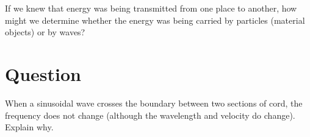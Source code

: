 \documentclass[12pt]{article}
\begin{document}
If we knew that energy was being transmitted from one place
to another, how might we determine whether the energy was
being carried by particles (material objects) or by waves?


\section*{Question \thequestions}

When a sinusoidal wave crosses the boundary between two
sections of cord, the frequency does not change
(although the wavelength and velocity do change). Explain why.
\end{document}
